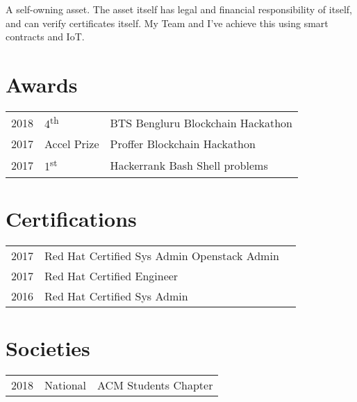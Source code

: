 \documentclass[]{deedy-resume-openfont}
\begin{document}
\begin{minipage}[t]{0.66\textwidth}
A self-owning asset. The asset itself has legal and financial responsibility of itself, and can verify certificates itself. My Team and I've achieve this using smart contracts and IoT.
\sectionsep


\section{Awards}
\begin{tabular}{rll}
2018	     & 4\textsuperscript{th}  & BTS Bengluru Blockchain Hackathon\\
2017	     & Accel Prize  & Proffer Blockchain Hackathon\\
2017	     & 1\textsuperscript{st}  & Hackerrank Bash Shell problems\\
\end{tabular}
\sectionsep

\section{Certifications}
\begin{tabular}{rll}
2017	     & Red Hat Certified Sys Admin Openstack Admin \\
2017	     & Red Hat Certified Engineer\\
2016	     & Red Hat Certified Sys Admin\\
\end{tabular}
\sectionsep


\section{Societies}

\begin{tabular}{rll}
2018   & National & ACM Students Chapter\\
\end{tabular}
\sectionsep

\end{minipage}
\end{document}
